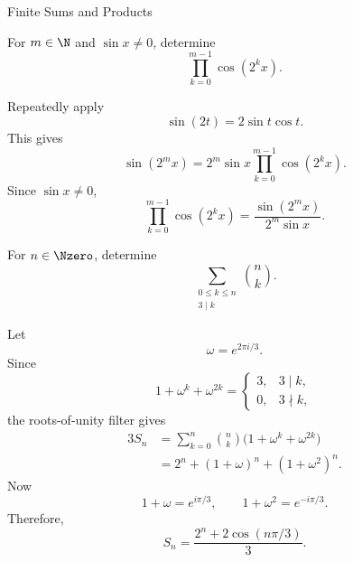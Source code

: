 \begin{expectedproblemgroup}{Finite Sums and Products}
        \begin{expectedsubproblem}
            For $m\in\N$ and $\sin x\neq0$, determine
            \[
                \prod_{k=0}^{m-1}\cos(2^k x).
            \]
        \end{expectedsubproblem}

        \begin{expectedsubsolution}
            Repeatedly apply
            \[
                \sin(2t)=2\sin t\cos t.
            \]
            This gives
            \[
                \sin(2^m x)
                =
                2^m\sin x
                \prod_{k=0}^{m-1}\cos(2^k x).
            \]
            Since $\sin x\neq0$,
            \[
                \boxed{
                    \prod_{k=0}^{m-1}\cos(2^k x)
                    =
                    \frac{\sin(2^m x)}{2^m\sin x}
                }.
            \]
        \end{expectedsubsolution}

        \begin{expectedsubproblem}
            For $n\in\Nzero$, determine
            \[
                \sum_{\substack{0\leq k\leq n\\3\mid k}}
                \binom{n}{k}.
            \]
        \end{expectedsubproblem}

        \begin{expectedsubsolution}
            Let
            \[
                \omega=e^{2\pi i/3}.
            \]
            Since
            \[
                1+\omega^k+\omega^{2k}
                =
                \begin{cases}
                    3, & 3\mid k,\\
                    0, & 3\nmid k,
                \end{cases}
            \]
            the roots-of-unity filter gives
            \[
                \begin{aligned}
                    3S_n
                    &=
                    \sum_{k=0}^{n}\binom{n}{k}
                    \bigl(1+\omega^k+\omega^{2k}\bigr)\\
                    &=
                    2^n+(1+\omega)^n+(1+\omega^2)^n.
                \end{aligned}
            \]
            Now
            \[
                1+\omega=e^{i\pi/3},
                \qquad
                1+\omega^2=e^{-i\pi/3}.
            \]
            Therefore,
            \[
                \boxed{
                    S_n
                    =
                    \frac{2^n+2\cos(n\pi/3)}{3}
                }.
            \]
        \end{expectedsubsolution}


\end{expectedproblemgroup}
